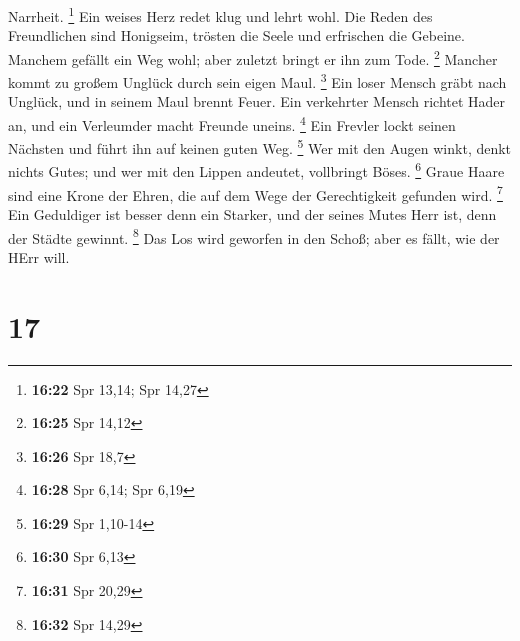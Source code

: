 Narrheit. \footnote{\textbf{16:22} Spr 13,14; Spr 14,27} 
Ein weises Herz redet klug und lehrt wohl.  Die Reden des
Freundlichen sind Honigseim, trösten die Seele und erfrischen die
Gebeine.  Manchem gefällt ein Weg wohl; aber zuletzt
bringt er ihn zum Tode. \footnote{\textbf{16:25} Spr 14,12}
 Mancher kommt zu großem Unglück durch sein eigen Maul.
\footnote{\textbf{16:26} Spr 18,7}  Ein loser Mensch
gräbt nach Unglück, und in seinem Maul brennt Feuer.  Ein
verkehrter Mensch richtet Hader an, und ein Verleumder macht Freunde
uneins. \footnote{\textbf{16:28} Spr 6,14; Spr 6,19}  Ein
Frevler lockt seinen Nächsten und führt ihn auf keinen guten Weg.
\footnote{\textbf{16:29} Spr 1,10-14}  Wer mit den Augen
winkt, denkt nichts Gutes; und wer mit den Lippen andeutet, vollbringt
Böses. \footnote{\textbf{16:30} Spr 6,13}  Graue Haare
sind eine Krone der Ehren, die auf dem Wege der Gerechtigkeit gefunden
wird. \footnote{\textbf{16:31} Spr 20,29}  Ein Geduldiger
ist besser denn ein Starker, und der seines Mutes Herr ist, denn der
Städte gewinnt. \footnote{\textbf{16:32} Spr 14,29}  Das
Los wird geworfen in den Schoß; aber es fällt, wie der HErr will.

\hypertarget{section-16}{%
\section{17}\label{section-16}}

